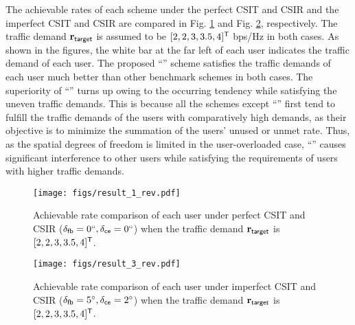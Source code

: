 \documentclass[draftclsnofoot, onecolumn, comsoc, 12pt]{IEEEtran}
\begin{document}
The achievable rates of each scheme under the perfect CSIT and CSIR and the imperfect CSIT and CSIR are compared in Fig. \ref{result_1} and  Fig. \ref{result_3}, respectively. {The traffic demand $\mathbf{r}_{\sf{target}}$ is assumed to be $[2, 2, 3, 3.5, 4]^{\sf{T}}$ bps/Hz in both cases.} 
As shown in the figures, the white bar at the far left of each user indicates the traffic demand of each user.
The proposed ``{}'' scheme satisfies the traffic demands of each user much better than other benchmark schemes in both cases. The superiority of ``{}'' 
turns up owing to the occurring tendency while satisfying the uneven traffic demands. This is because all the schemes except ``{}'' first tend to fulfill the traffic demands of the users with comparatively high demands, as their objective is to minimize the summation of the users' {unused} or {unmet rate}.
Thus, as the {spatial degrees of freedom} is limited in the user-overloaded case, ``{}'' causes significant interference to other users while satisfying the requirements of users with higher traffic demands.


\begin{figure}[!t]
\centering
 		\texttt{[image: figs/result\_1\_rev.pdf]}%
 		\caption{{Achievable rate comparison of each user under perfect CSIT and CSIR ($\delta_{\sf{fb}}=0^{\circ}, \delta_{\sf{ce}}=0^{\circ}$) when the traffic demand $\mathbf{r}_{\sf{target}}$ is $[2, 2, 3, 3.5, 4]^{\sf{T}}$.}}
    	\label{result_1} %
\end{figure}

\begin{figure}[!t]
\centering
 		\texttt{[image: figs/result\_3\_rev.pdf]}%
 		\caption{{Achievable rate comparison of each user under imperfect CSIT and CSIR ($\delta_{\sf{fb}}=5^{\circ}, \delta_{\sf{ce}}=2^{\circ}$) when the traffic demand $\mathbf{r}_{\sf{target}}$ is $[2, 2, 3, 3.5, 4]^{\sf{T}}$.}}
    	\label{result_3} %
\end{figure}
\end{document}
